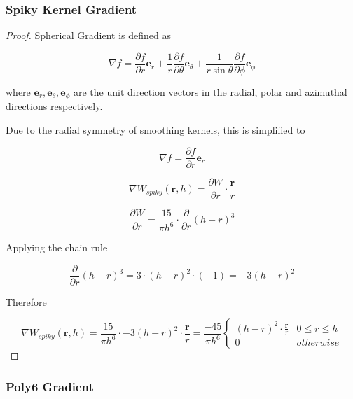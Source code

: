 \documentclass[12pt]{article}
\begin{document}
    \subsubsection{Spiky Kernel Gradient}

    \begin{proof}
        Spherical Gradient is defined as

        $$\nabla f = \frac{\partial{f}}{\partial{r}}\textbf{e}_r + \frac{1}{r}\frac{\partial{f}}{\partial{\theta}}\textbf{e}_{\theta} + \frac{1}{r \sin{\theta}}\frac{\partial{f}}{\partial{\phi}}\textbf{e}_{\phi}$$
        
        where $\textbf{e}_{r}, \textbf{e}_{\theta}, \textbf{e}_{\phi}$ are the unit direction vectors in the radial, polar and azimuthal directions respectively.

        Due to the radial symmetry of smoothing kernels, this is simplified to

        $$\nabla f = \frac{\partial{f}}{\partial{r}}\textbf{e}_r$$

        $$\nabla W_{spiky}(\textbf{r}, h) = \frac{\partial{W}}{\partial{r}} \cdot \frac{\textbf{r}}{r}$$

        $$\frac{\partial{W}}{\partial{r}} = \frac{15}{\pi{h}^6} \cdot \frac{\partial}{\partial{r}} (h - r)^3$$

        Applying the chain rule

        $$\frac{\partial}{\partial{r}} (h - r)^3 = 3 \cdot (h - r)^2 \cdot (-1) = -3(h - r)^2$$

        Therefore

        $$\nabla{W_{spiky}(\textbf{r}, h)} = \frac{15}{\pi{h}^6} \cdot -3(h - r)^2 \cdot \frac{\textbf{r}}{r} = \frac{-45}{\pi{h}^6}\begin{cases}
            (h - r)^2 \cdot \frac{\textbf{r}}{r} & 0 \leq r \leq h \\
            0 & otherwise
        \end{cases}$$
    \end{proof}

    \subsubsection{Poly6 Gradient}
\end{document}
